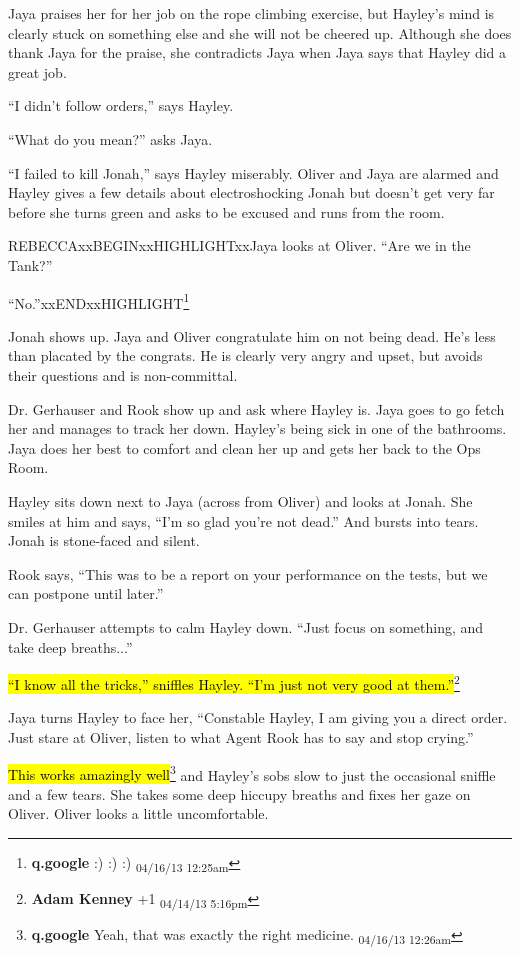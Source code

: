 Jaya praises her for her job on the rope climbing exercise, but Hayley's mind is clearly stuck on something else and she will not be cheered up.  Although she does thank Jaya for the praise, she contradicts Jaya when Jaya says that Hayley did a great job.

``I didn't follow orders,'' says Hayley.

``What do you mean?'' asks Jaya.

``I failed to kill Jonah,'' says Hayley miserably.  Oliver and Jaya are alarmed and Hayley gives a few details about electroshocking Jonah but doesn't get very far before she turns green and asks to be excused and runs from the room.



REBECCAxxBEGINxxHIGHLIGHTxxJaya looks at Oliver.  ``Are we in the Tank?''

``No.''xxENDxxHIGHLIGHT\footnote{\textbf{q.google }:) :) :) \textsubscript{04/16/13 12:25am}}



Jonah shows up.  Jaya and Oliver congratulate him on not being dead.  He's less than placated by the congrats.  He is clearly very angry and upset, but avoids their questions and is non-committal.



Dr. Gerhauser and Rook show up and ask where Hayley is.  Jaya goes to go fetch her and manages to track her down.  Hayley's being sick in one of the bathrooms.  Jaya does her best to comfort and clean her up and gets her back to the Ops Room.



Hayley sits down next to Jaya (across from Oliver) and looks at Jonah.  She smiles at him and says, ``I'm so glad you're not dead.'' And bursts into tears.  Jonah is stone-faced and silent.  

Rook says, ``This was to be a report on your performance on the tests, but we can postpone until later.''

Dr. Gerhauser attempts to calm Hayley down.  ``Just focus on something, and take deep breaths...''

\hl{``I know all the tricks,'' sniffles Hayley.  ``I'm just not very good at them.''}\footnote{\textbf{Adam Kenney }+1 \textsubscript{04/14/13 5:16pm}}

Jaya turns Hayley to face her, ``Constable Hayley, I am giving you a direct order.  Just stare at Oliver, listen to what Agent Rook has to say and stop crying.''

\hl{This works amazingly well}\footnote{\textbf{q.google }Yeah, that was exactly the right medicine. \textsubscript{04/16/13 12:26am}} and Hayley's sobs slow to just the occasional sniffle and a few tears.  She takes some deep hiccupy breaths and fixes her gaze on Oliver.  Oliver looks a little uncomfortable.




